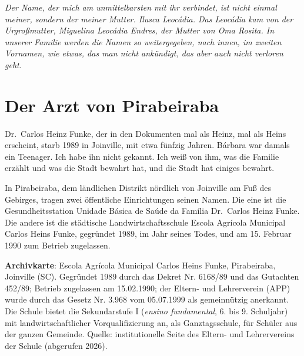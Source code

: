 \documentclass[
  ngerman,
  11pt,
  openany]{book}
\begin{document}
\emph{Der Name, der mich am unmittelbarsten mit ihr verbindet, ist nicht
einmal meiner, sondern der meiner Mutter. Ilusca Leocádia. Das Leocádia
kam von der Urgroßmutter, Miguelina Leocádia Endres, der Mutter von Oma
Rosita. In unserer Familie werden die Namen so weitergegeben, nach
innen, im zweiten Vornamen, wie etwas, das man nicht ankündigt, das aber
auch nicht verloren geht.}

\section{Der Arzt von Pirabeiraba}\label{der-arzt-von-pirabeiraba}

Dr.~Carlos Heinz Funke, der in den Dokumenten mal als Heinz, mal als
Heins erscheint, starb 1989 in Joinville, mit etwa fünfzig Jahren.
Bárbara war damals ein Teenager. Ich habe ihn nicht gekannt. Ich weiß
von ihm, was die Familie erzählt und was die Stadt bewahrt hat, und die
Stadt hat einiges bewahrt.

In Pirabeiraba, dem ländlichen Distrikt nördlich von Joinville am Fuß
des Gebirges, tragen zwei öffentliche Einrichtungen seinen Namen. Die
eine ist die Gesundheitsstation Unidade Básica de Saúde da Família
Dr.~Carlos Heinz Funke. Die andere ist die städtische
Landwirtschaftsschule Escola Agrícola Municipal Carlos Heins Funke,
gegründet 1989, im Jahr seines Todes, und am 15. Februar 1990 zum
Betrieb zugelassen.

\begin{ficha}

\textbf{Archivkarte}: Escola Agrícola Municipal Carlos Heins Funke,
Pirabeiraba, Joinville (SC). Gegründet 1989 durch das Dekret Nr. 6168/89
und das Gutachten 452/89; Betrieb zugelassen am 15.02.1990; der Eltern-
und Lehrerverein (APP) wurde durch das Gesetz Nr. 3.968 vom 05.07.1999
als gemeinnützig anerkannt. Die Schule bietet die Sekundarstufe I
(\emph{ensino fundamental}, 6. bis 9. Schuljahr) mit
landwirtschaftlicher Vorqualifizierung an, als Ganztagsschule, für
Schüler aus der ganzen Gemeinde. Quelle: institutionelle Seite des
Eltern- und Lehrervereins der Schule (abgerufen 2026).

\end{ficha}
\end{document}
